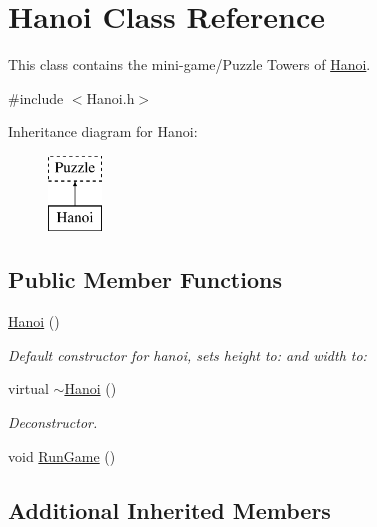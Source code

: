\hypertarget{classHanoi}{\section{Hanoi Class Reference}
\label{classHanoi}
}


This class contains the mini-\/game/\-Puzzle Towers of \hyperlink{classHanoi}{Hanoi}.  




{\ttfamily \#include $<$Hanoi.\-h$>$}

Inheritance diagram for Hanoi\-:\begin{figure}[H]
\begin{center}
\leavevmode
\includegraphics[height=2.000000cm]{classHanoi}
\end{center}
\end{figure}
\subsection*{Public Member Functions}
\begin{DoxyCompactItemize}
\item 
\hyperlink{classHanoi_a2af453ec21277f20edc002be08f22346}{Hanoi} ()
\begin{DoxyCompactList}\small\item\em Default constructor for hanoi, sets height to\-: and width to\-: \end{DoxyCompactList}\item 
\hypertarget{classHanoi_a59760291bfeda65330ff53c429a4e55b}{virtual \hyperlink{classHanoi_a59760291bfeda65330ff53c429a4e55b}{$\sim$\-Hanoi} ()}\label{classHanoi_a59760291bfeda65330ff53c429a4e55b}

\begin{DoxyCompactList}\small\item\em Deconstructor. \end{DoxyCompactList}\item 
void \hyperlink{classHanoi_a2032169272e11d26ce253e2b264b9f31}{Run\-Game} ()
\end{DoxyCompactItemize}
\subsection*{Additional Inherited Members}


